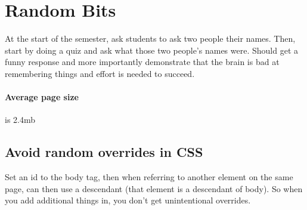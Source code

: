 \documentclass[]{article}
\newcommand{\<}{\guilsinglleft}
\renewcommand{\>}{\guilsinglright}
\begin{document}
\section{Random Bits}
At the start of the semester, ask students to ask two people their names.  Then, start by doing a quiz and ask what those two people's names were.  Should get a funny response and more importantly demonstrate that the brain is bad at remembering things and effort is needed to succeed.

\paragraph{Average page size} is 2.4mb 

\subsection{Avoid random overrides in CSS}
Set an id to the body tag, then when referring to another element on the same page, can then use a descendant (that element is a descendant of body). So when  you add additional things in, you don't get unintentional overrides.
\end{document}
